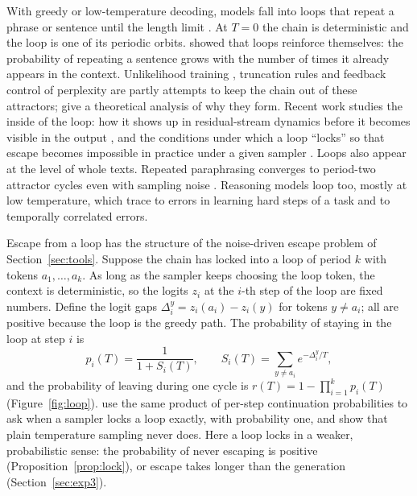 With greedy or low-temperature decoding, models fall into loops that repeat a phrase or sentence until the length limit \citep{holtzman2019curious}. At $T=0$ the chain is deterministic and the loop is one of its periodic orbits. \citet{xu2022learning} showed that loops reinforce themselves: the probability of repeating a sentence grows with the number of times it already appears in the context. Unlikelihood training \citep{welleck2019neural}, truncation rules \citep{hewitt2022truncation,meister2022locally} and feedback control of perplexity \citep{basu2020mirostat} are partly attempts to keep the chain out of these attractors; \citet{fu2020theoretical} give a theoretical analysis of why they form. Recent work studies the inside of the loop: how it shows up in residual-stream dynamics before it becomes visible in the output \citep{zhang2026uncovering}, and the conditions under which a loop ``locks'' so that escape becomes impossible in practice under a given sampler \citep{chen2026repetition}. Loops also appear at the level of whole texts. Repeated paraphrasing converges to period-two attractor cycles even with sampling noise \citep{wang2025unveiling}. Reasoning models loop too, mostly at low temperature, which \citet{pipis2025wait} trace to errors in learning hard steps of a task and to temporally correlated errors.

Escape from a loop has the structure of the noise-driven escape problem of Section~\ref{sec:tools}. Suppose the chain has locked into a loop of period $k$ with tokens $a_1,\dots,a_k$. As long as the sampler keeps choosing the loop token, the context is deterministic, so the logits $z_i$ at the $i$-th step of the loop are fixed numbers. Define the logit gaps $\Delta_i^{y}=z_i(a_i)-z_i(y)$ for tokens $y\neq a_i$; all are positive because the loop is the greedy path. The probability of staying in the loop at step $i$ is
\begin{equation}
p_i(T)=\frac{1}{1+S_i(T)},\qquad S_i(T)=\sum_{y\neq a_i} e^{-\Delta_i^{y}/T},
\label{eq:stay}
\end{equation}
and the probability of leaving during one cycle is $r(T)=1-\prod_{i=1}^{k}p_i(T)$ (Figure~\ref{fig:loop}). \citet{chen2026repetition} use the same product of per-step continuation probabilities to ask when a sampler locks a loop exactly, with probability one, and show that plain temperature sampling never does. Here a loop locks in a weaker, probabilistic sense: the probability of never escaping is positive (Proposition~\ref{prop:lock}), or escape takes longer than the generation (Section~\ref{sec:exp3}).

